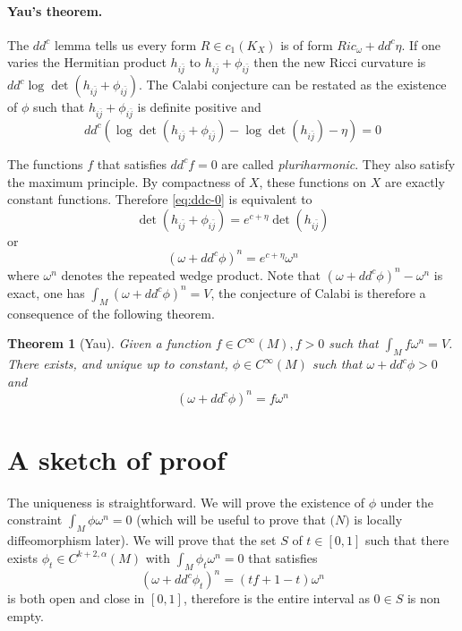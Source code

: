 \documentclass[11pt]{article}
\newtheorem{theorem}{Theorem}
\begin{document}
\paragraph{Yau's theorem.}
\label{sec:org9fd777f}
The \(dd^c\) lemma tells us every form \(R\in c_1(K_X)\) is of form \(Ric_{\omega} + dd^c\eta\). If one
varies the Hermitian product \(h_{i\bar j}\) to \(h_{i\bar j} + \phi_{i\bar j}\) then the new Ricci
curvature is \(dd^c\log\det(h_{i\bar j} + \phi_{i\bar j})\). The Calabi conjecture can be restated as
the existence of \(\phi\) such that \(h_{i\bar j} + \phi_{i\bar j}\) is definite positive and
\begin{equation}
\label{eq:ddc-0}
dd^c\left( \log\det(h_{i\bar j} + \phi_{i\bar j}) - \log\det(h_{i\bar j}) -\eta\right) = 0
\end{equation}

The functions \(f\) that satisfies \(dd^cf = 0\) are called \emph{pluriharmonic}. They also satisfy the
maximum principle. By compactness of \(X\), these functions on \(X\) are exactly constant
functions. Therefore \eqref{eq:ddc-0} is equivalent to
\[
\det(h_{i\bar j} + \phi_{i\bar j}) = e^{c+\eta}\det(h_{i \bar j})
\]
or
\[
(\omega + dd^c\phi)^n = e^{c+\eta}\omega^n
\]
where \(\omega^n\) denotes the repeated wedge product. Note that \((\omega +dd^c\phi)^n - \omega^n\) is exact,
one has \(\int_M (\omega +dd^c\phi)^n = V\), the conjecture of Calabi is therefore a consequence of
the following theorem.

\begin{theorem}[Yau]
Given a function \(f\in C^\infty(M), f>0\) such that \(\int_M f\omega^n = V\). There exists, and unique
up to constant, \(\phi\in C^\infty(M)\) such that \(\omega + dd^c\phi >0\) and
\[
(\omega + dd^c\phi)^n = f\omega^n
\]
\end{theorem}

\section{A sketch of proof}
\label{sec:orgb06fe73}
The uniqueness is straightforward. We will prove the existence of \(\phi\) under the constraint
\(\int_M\phi\omega^n = 0\) (which will be useful to prove that \(\mathcal(N)\) is locally diffeomorphism
later). We will prove that the set \(S\) of \(t\in [0,1]\) such that there exists \(\phi_t\in
C^{k+2,\alpha}(M)\) with \(\int_M \phi_t\omega^n = 0\) that satisfies
\begin{equation}
\label{eq:omega-convex-t}
(\omega + dd^c\phi_t)^n = (tf + 1-t)\omega^n
\end{equation}
is both open and close in \([0,1]\), therefore is the entire interval as \(0\in S\) is non empty.
\end{document}
